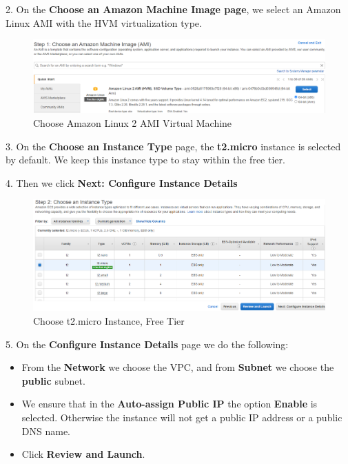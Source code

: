 \documentclass[12pt,a4paper,twoside]{article}
\begin{document}
2. On the \textbf{Choose an Amazon Machine Image page}, we select an Amazon Linux AMI with the HVM virtualization type.


\begin{figure}[H]
    \centering
        \includegraphics[width=15cm]{images-aws/5-amazon-linux.png}
        \caption{Choose Amazon Linux 2 AMI Virtual Machine}
\end{figure}


3. On the \textbf{Choose an Instance Type} page, the \textbf{t2.micro} instance is selected by default. We keep this instance type to stay within the free tier.


4. Then we click \textbf{Next: Configure Instance Details}


\begin{figure}[H]
    \centering
        \includegraphics[width=15cm]{images-aws/6-instance-type.png}
        \caption{Choose t2.micro Instance, Free Tier}
\end{figure}


5. On the \textbf{Configure Instance Details} page we do the following:


\begin{itemize}
	\item From the \textbf{Network} we choose the VPC, and from \textbf{Subnet} we choose the \textbf{public} subnet.
	\item We ensure that in the \textbf{Auto-assign Public IP} the option \textbf{Enable} is selected. Otherwise the instance will not
get a public IP address or a public DNS name.
	\item Click \textbf{Review and Launch}.
\end{itemize}
\end{document}
